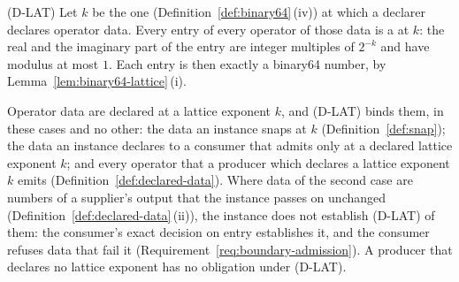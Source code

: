 
\begin{requirement}\label{req:declared-lattice}
(D-LAT) Let $k$ be the one 
(Definition~\ref{def:binary64}\,(iv)) at which a declarer declares operator
data. Every entry of every operator of those data is a  at
$k$: the real and the imaginary part of the entry are integer multiples of
$2^{-k}$ and have modulus at most $1$. Each entry is then exactly a binary64
number, by Lemma~\ref{lem:binary64-lattice}\,(i).

Operator data are declared at a lattice exponent $k$, and (D-LAT) binds them,
in these cases and no other: the data an instance snaps at $k$
(Definition~\ref{def:snap}); the data an instance declares to a consumer that
admits  only at a declared lattice exponent $k$; and every
operator that a producer which declares a lattice exponent $k$ emits
(Definition~\ref{def:declared-data}). Where data of the second case are
numbers of a supplier's output that the instance passes on unchanged
(Definition~\ref{def:declared-data}\,(ii)), the instance does not establish
(D-LAT) of them: the consumer's exact decision on entry establishes it, and
the consumer refuses data that fail it
(Requirement~\ref{req:boundary-admission}). A producer that declares no
lattice exponent has no obligation under (D-LAT).
\end{requirement}
